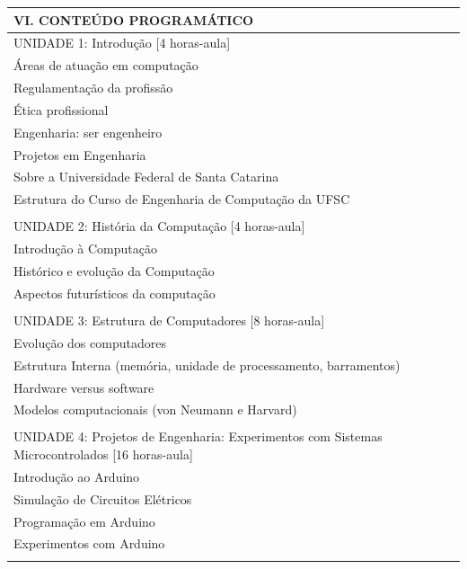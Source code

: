 \documentclass[12pt]{article}
\begin{document}
\begin{longtable}{|L{1.025\textwidth}|} \hline
%
{\bf VI. CONTEÚDO PROGRAMÁTICO } \\ \hline

UNIDADE 1: Introdução [4 horas-aula] \\
Áreas de atuação em computação \\
Regulamentação da profissão \\
Ética profissional \\
Engenharia: ser engenheiro \\
Projetos em Engenharia \\
Sobre a Universidade Federal de Santa Catarina \\
Estrutura do Curso de Engenharia de Computação da UFSC \\\\

UNIDADE 2: História da Computação [4 horas-aula] \\
Introdução à Computação \\
Histórico e evolução da Computação \\
Aspectos futurísticos da computação \\\\

UNIDADE 3: Estrutura de Computadores [8 horas-aula] \\
Evolução dos computadores \\
Estrutura Interna (memória, unidade de processamento, barramentos) \\
Hardware versus software \\
Modelos computacionais (von Neumann e Harvard) \\\\

UNIDADE 4: Projetos de Engenharia: Experimentos com Sistemas Microcontrolados [16 horas-aula] \\
Introdução ao Arduino \\
Simulação de Circuitos Elétricos \\
Programação em Arduino \\
Experimentos com Arduino \\

\\ \hline
\end{longtable} 
\end{document}
